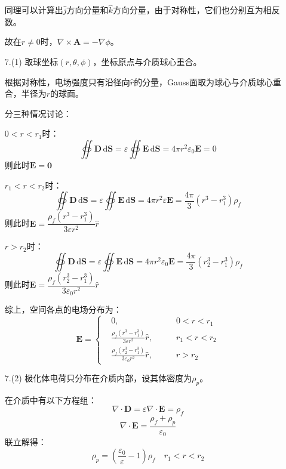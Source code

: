 \documentclass[a4paper,fontset=none]{ctexart}
\begin{document}
\begin{itemize}
        同理可以计算出$\hat{j}$方向分量和$\hat{k}$方向分量，由于对称性，它们也分别互为相反数。

        故在$r \neq 0$时，$\nabla\times\bm{A} = -\nabla\phi$。

        \item[7.(1)]
        取球坐标$(r,\theta,\phi)$，坐标原点与介质球心重合。

        根据对称性，电场强度只有沿径向$\hat{r}$的分量，Gauss面取为球心与介质球心重合，半径为$r$的球面。

        分三种情况讨论：

        $0 < r < r_1$时：
        \[
            \oiint \bm{D}\,\mathrm{d}\bm{S} = \varepsilon\oiint \bm{E}\,\mathrm{d}\bm{S} = 4\pi r^2\varepsilon_0\bm{E} = 0
        \]
        则此时$\bm{E} = \bm{0}$

        $r_1 < r < r_2$时：
        \[
            \oiint \bm{D}\,\mathrm{d}\bm{S} = \varepsilon\oiint \bm{E}\,\mathrm{d}\bm{S} = 4\pi r^2\varepsilon\bm{E} = \frac{4\pi}{3}(r^3 - r_1^3)\rho_f
        \]
        则此时$\bm{E} = \dfrac{\rho_f(r^3 - r_1^3)}{3\varepsilon r^2}\hat{r}$

        $r > r_2$时：
        \[
            \oiint \bm{D}\,\mathrm{d}\bm{S} = \varepsilon\oiint \bm{E}\,\mathrm{d}\bm{S} = 4\pi r^2\varepsilon_0\bm{E} = \frac{4\pi}{3}(r_2^3 - r_1^3)\rho_f
        \]
        则此时$\bm{E} = \dfrac{\rho_f(r_2^3 - r_1^3)}{3\varepsilon_0 r^2}\hat{r}$

        综上，空间各点的电场分布为：
        \[
            \bm{E} = \left\{
        \begin{aligned}
            & 0,\qquad& 0 < r < r_1 \\
            & \frac{\rho_f(r^3 - r_1^3)}{3\varepsilon r^2}\hat{r},\qquad& r_1 < r < r_2 \\
            & \frac{\rho_f(r_2^3 - r_1^3)}{3\varepsilon_0 r^2}\hat{r},\qquad& r > r_2
        \end{aligned}
        \right.
        \]

        \item[7.(2)]
        \textparagraph 极化体电荷只分布在介质内部，设其体密度为$\rho_p$。

        在介质中有以下方程组：
        \[
            \nabla\cdot\bm{D} = \varepsilon\nabla\cdot\bm{E} = \rho_f
        \]
        \[
            \nabla\cdot\bm{E} = \frac{\rho_f + \rho_p}{\varepsilon_0}
        \]
        联立解得：
        \[
            \rho_p = \left(\frac{\varepsilon_0}{\varepsilon} - 1\right)\rho_f \quad r_1 < r < r_2
        \]


\end{itemize}
\end{document}
